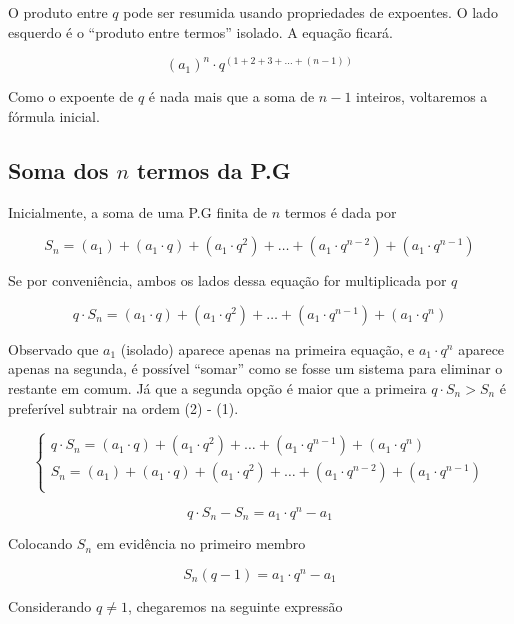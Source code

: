 \documentclass[11pt]{article}
\begin{document}
O produto entre $q$ pode ser resumida usando propriedades de expoentes. O lado esquerdo é o ``produto entre termos'' isolado. A equação ficará.

\[(a_{1})^{n}\cdot q^{(1 + 2 + 3 + \dots + (n - 1))}\]

Como o expoente de $q$ é nada mais que a soma de $n - 1$ inteiros, voltaremos a fórmula inicial.

\subsection{Soma dos $n$ termos da P.G}

Inicialmente, a soma de uma P.G finita de $n$ termos é dada por

\[S_{n} = (a_{1}) + (a_{1}\cdot q) + (a_{1}\cdot q^{2}) + \dots + (a_{1}\cdot q^{n - 2}) + (a_{1}\cdot q^{n - 1})\]

Se por conveniência, ambos os lados dessa equação for multiplicada por $q$

\[q\cdot S_{n} = (a_{1}\cdot q) + (a_{1}\cdot q^{2}) + \dots + (a_{1}\cdot q^{n - 1}) + (a_{1}\cdot q^{n})\]

Observado que $a_{1}$ (isolado) aparece apenas na primeira equação, e $a_{1}\cdot q^{n}$ aparece apenas na segunda, é possível ``somar'' como se fosse um sistema para eliminar o restante em comum. Já que a segunda opção é maior que a primeira $q\cdot S_{n} > S_{n}$ é preferível subtrair na ordem (2) - (1).

\begin{tcolorbox}[colback=LightYellow]
\begin{equation*}
  \begin{cases}
    q\cdot S_{n} = (a_{1}\cdot q) + (a_{1}\cdot q^{2}) + \dots + (a_{1}\cdot q^{n - 1}) + (a_{1}\cdot q^{n}) \\
    S_{n} = (a_{1}) + (a_{1}\cdot q) + (a_{1}\cdot q^{2}) + \dots + (a_{1}\cdot q^{n - 2}) + (a_{1}\cdot q^{n - 1}) \\
  \end{cases}
\end{equation*}

\[q\cdot S_{n} - S_{n} = a_{1}\cdot q^{n} - a_{1}\]

Colocando $S_{n}$ em evidência no primeiro membro

\[S_{n} (q - 1) = a_{1}\cdot q^{n} - a_{1}\]

\end{tcolorbox}
Considerando $q \neq 1$, chegaremos na seguinte expressão
\end{document}
